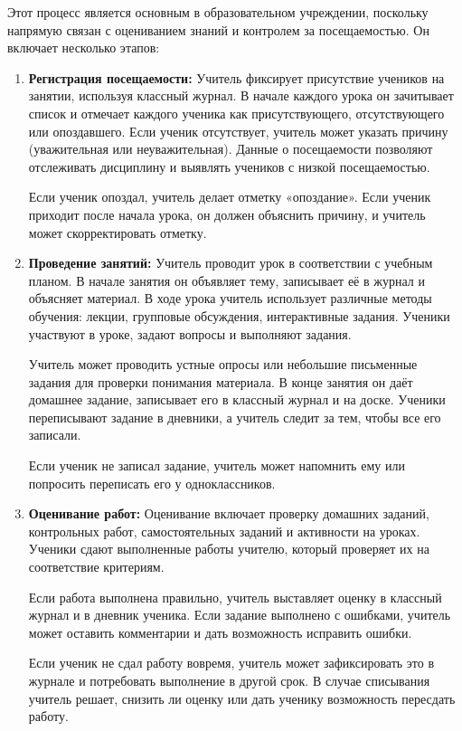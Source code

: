 \documentclass[a4paper, final]{article}
\begin{document}
Этот процесс является основным в образовательном учреждении, поскольку напрямую связан с оцениванием знаний и контролем за посещаемостью. Он включает несколько этапов:
\begin{enumerate}
  \item \textbf{Регистрация посещаемости:} Учитель фиксирует присутствие учеников на занятии, используя классный журнал. В начале каждого урока он зачитывает список и отмечает каждого ученика как присутствующего, отсутствующего или опоздавшего. Если ученик отсутствует, учитель может указать причину (уважительная или неуважительная). Данные о посещаемости позволяют отслеживать дисциплину и выявлять учеников с низкой посещаемостью.

  Если ученик опоздал, учитель делает отметку «опоздание». Если ученик приходит после начала урока, он должен объяснить причину, и учитель может скорректировать отметку. %

  \item \textbf{Проведение занятий:} Учитель проводит урок в соответствии с учебным планом. В начале занятия он объявляет тему, записывает её в журнал и объясняет материал. В ходе урока учитель использует различные методы обучения: лекции, групповые обсуждения, интерактивные задания. Ученики участвуют в уроке, задают вопросы и выполняют задания.

  Учитель может проводить устные опросы или небольшие письменные задания для проверки понимания материала. В конце занятия он даёт домашнее задание, записывает его в классный журнал и на доске. Ученики переписывают задание в дневники, а учитель следит за тем, чтобы все его записали.
  
  Если ученик не записал задание, учитель может напомнить ему или попросить переписать его у одноклассников.

  \item \textbf{Оценивание работ:} Оценивание включает проверку домашних заданий, контрольных работ, самостоятельных заданий и активности на уроках. Ученики сдают выполненные работы учителю, который проверяет их на соответствие критериям.

  Если работа выполнена правильно, учитель выставляет оценку в классный журнал и в дневник ученика. Если задание выполнено с ошибками, учитель может оставить комментарии и дать возможность исправить ошибки.
  
  Если ученик не сдал работу вовремя, учитель может зафиксировать это в журнале и потребовать выполнение в другой срок. В случае списывания учитель решает, снизить ли оценку или дать ученику возможность пересдать работу.
  

\end{enumerate}
\end{document}
